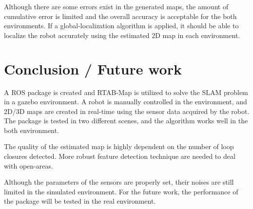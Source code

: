 \documentclass[10pt,journal,compsoc]{IEEEtran}
\begin{document}
Although there are some errors exist in the generated maps, the amount of cumulative error is limited and the overall accuracy is acceptable for the both environments. If a global-localization algorithm is applied, it should be able to localize the robot accurately using the estimated 2D map in each environment.

\section{Conclusion / Future work}
A ROS package is created and RTAB-Map is utilized to solve the SLAM problem in a gazebo environment. A robot is manually controlled in the environment, and 2D/3D maps are created in real-time using the sensor data acquired by the robot. The package is tested in two different scenes, and the algorithm works well in the both environment.

The quality of the estimated map is highly dependent on the number of loop closures detected. More robust feature detection technique are needed to deal with open-areas.

Although the parameters of the sensors are properly set, their noises are still limited in the simulated environment. For the future work, the performance of the package will be tested in the real environment. 



\end{document}
